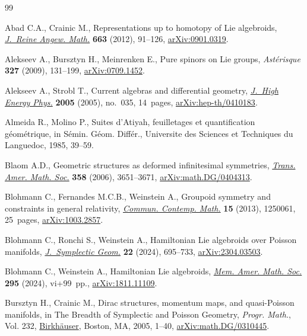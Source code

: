 \begin{thebibliography}{99}
\footnotesize\itemsep=0pt

Abad C.A., Crainic M., Representations up to homotopy of {L}ie algebroids,
 \href{https://doi.org/10.1515/CRELLE.2011.095}{\textit{J.~Reine Angew. Math.}} \textbf{663} (2012), 91--126,
 \href{https://arxiv.org/abs/0901.0319}{arXiv:0901.0319}.

Alekseev A., Bursztyn H., Meinrenken E., Pure spinors on {L}ie groups,
 \textit{Ast\'erisque} \textbf{327} (2009), 131--199, \href{https://arxiv.org/abs/0709.1452}{arXiv:0709.1452}.

Alekseev A., Strobl T., Current algebras and differential geometry,
 \href{https://doi.org/10.1088/1126-6708/2005/03/035}{\textit{J.~High Energy Phys.}} \textbf{2005} (2005), no.~035, 14~pages,
 \href{https://arxiv.org/abs/hep-th/0410183}{arXiv:hep-th/0410183}.

Almeida R., Molino P., Suites d'Atiyah, feuilletages et quantification
 g\'eom\'etrique, in S\'{e}min. G\'{e}om. Diff\'{e}r., Universite des Sciences
 et Techniques du Languedoc, 1985, 39--59.

Blaom A.D., Geometric structures as deformed infinitesimal symmetries,
 \href{https://doi.org/10.1090/S0002-9947-06-04057-8}{\textit{Trans. Amer. Math. Soc.}} \textbf{358} (2006), 3651--3671,
 \href{https://arxiv.org/abs/math.DG/0404313}{arXiv:math.DG/0404313}.

Blohmann C., Fernandes M.C.B., Weinstein A., Groupoid symmetry and constraints
 in general relativity, \href{https://doi.org/10.1142/S0219199712500617}{\textit{Commun. Contemp. Math.}} \textbf{15} (2013),
 1250061, 25~pages, \href{https://arxiv.org/abs/1003.2857}{arXiv:1003.2857}.

Blohmann C., Ronchi S., Weinstein A., Hamiltonian {L}ie algebroids over
 {P}oisson manifolds, \href{https://doi.org/10.4310/jsg.241021220342}{\textit{J.~Symplectic Geom.}} \textbf{22} (2024),
 695--733, \href{https://arxiv.org/abs/2304.03503}{arXiv:2304.03503}.

Blohmann C., Weinstein A., Hamiltonian {L}ie algebroids, \href{https://doi.org/10.1090/memo/1474}{\textit{Mem. Amer.
 Math. Soc.}} \textbf{295} (2024), vi+99~pp., \href{https://arxiv.org/abs/1811.11109}{arXiv:1811.11109}.

Bursztyn H., Crainic M., Dirac structures, momentum maps, and quasi-{P}oisson
 manifolds, in The {B}readth of {S}ymplectic and {P}oisson {G}eometry,
 \textit{Progr. Math.}, Vol. 232, \href{https://doi.org/10.1007/0-8176-4419-9_1}{Birkh\"auser}, Boston, MA, 2005, 1--40,
 \href{https://arxiv.org/abs/math.DG/0310445}{arXiv:math.DG/0310445}.


\end{thebibliography}
